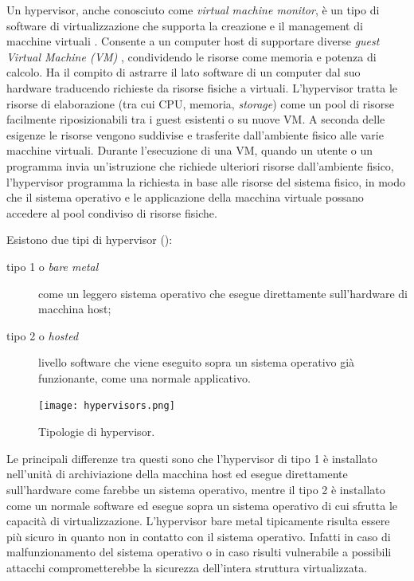 Un hypervisor, anche conosciuto come \textit{virtual machine monitor}, è un tipo di software di virtualizzazione che supporta la creazione e il management di macchine virtuali \cite{desai2013hypervisor,techtargetHypervisor}. Consente a un computer host di supportare diverse \textit{guest Virtual Machine (VM)}  , condividendo le risorse come memoria e potenza di calcolo.
Ha il compito di astrarre il lato software di un computer dal suo hardware traducendo richieste da risorse fisiche a virtuali.
L'hypervisor tratta le risorse di elaborazione (tra cui CPU, memoria, \textit{storage}) come un pool di risorse facilmente riposizionabili tra i guest esistenti o su nuove VM.
A seconda delle esigenze le risorse vengono suddivise e trasferite dall'ambiente fisico alle varie macchine virtuali. Durante l'esecuzione di una VM, quando un utente o un programma invia un'istruzione che richiede ulteriori risorse dall'ambiente fisico, l'hypervisor programma la richiesta in base alle risorse del sistema fisico, in modo che il sistema operativo e le applicazione della macchina virtuale possano accedere al pool condiviso di risorse fisiche.

Esistono due tipi di hypervisor ():
\begin{description}
    \item[tipo 1 o \textit{bare metal}] come un leggero sistema operativo che esegue direttamente sull'hardware di macchina host;
    \item[tipo 2 o \textit{hosted}] livello software  che viene eseguito  sopra un sistema operativo già funzionante, come una normale applicativo.
\end{description}

\begin{figure}[hbtp]
    \centering
    \texttt{[image: hypervisors.png]}
    \caption{Tipologie di hypervisor.}
    \label{fig:hypervisors}
\end{figure}

Le principali differenze tra questi sono che l'hypervisor di tipo 1 è installato nell'unità di archiviazione della macchina host ed esegue direttamente sull'hardware come farebbe un sistema operativo, mentre il tipo 2 è installato come un normale software ed esegue sopra un sistema operativo di cui sfrutta le capacità di virtualizzazione.
L'hypervisor bare metal tipicamente risulta essere più sicuro in quanto non in contatto con il sistema operativo. Infatti in caso di malfunzionamento del sistema operativo o in caso risulti vulnerabile a possibili attacchi comprometterebbe la sicurezza dell'intera struttura virtualizzata.

